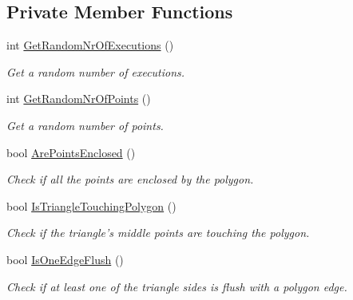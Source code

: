 \subsection*{\-Private \-Member \-Functions}
\begin{DoxyCompactItemize}
\item 
int \hyperlink{classmultiscaletest_1_1MinEnclosingTriangleFinderTest_a840237e49598c5f7b067cdd071cebf9f}{\-Get\-Random\-Nr\-Of\-Executions} ()
\begin{DoxyCompactList}\small\item\em \-Get a random number of executions. \end{DoxyCompactList}\item 
int \hyperlink{classmultiscaletest_1_1MinEnclosingTriangleFinderTest_adc8b2cb0bce76d96d3d5c3da008fa87a}{\-Get\-Random\-Nr\-Of\-Points} ()
\begin{DoxyCompactList}\small\item\em \-Get a random number of points. \end{DoxyCompactList}\item 
bool \hyperlink{classmultiscaletest_1_1MinEnclosingTriangleFinderTest_a73de7a5f4f5fc4eb72ce68e4a4d793b7}{\-Are\-Points\-Enclosed} ()
\begin{DoxyCompactList}\small\item\em \-Check if all the points are enclosed by the polygon. \end{DoxyCompactList}\item 
bool \hyperlink{classmultiscaletest_1_1MinEnclosingTriangleFinderTest_a03d3983c2b6cef870e6e6c8c79c06976}{\-Is\-Triangle\-Touching\-Polygon} ()
\begin{DoxyCompactList}\small\item\em \-Check if the triangle's middle points are touching the polygon. \end{DoxyCompactList}\item 
bool \hyperlink{classmultiscaletest_1_1MinEnclosingTriangleFinderTest_a3a9be9bf036777162a594ccc77cb6114}{\-Is\-One\-Edge\-Flush} ()
\begin{DoxyCompactList}\small\item\em \-Check if at least one of the triangle sides is flush with a polygon edge. \end{DoxyCompactList}\end{DoxyCompactItemize}
